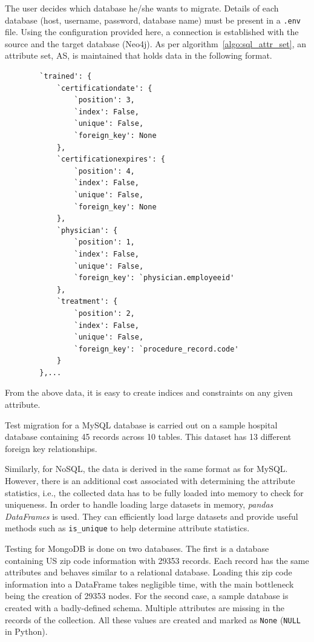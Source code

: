 \documentclass[12pt]{article}
\begin{document}
    The user decides which database he/she wants to migrate. Details of each database (host, username, password, database name) must be present in a \verb|.env| file. Using the configuration provided here, a connection is established with the source and the target database (Neo4j). As per algorithm~\ref{algo:sql_attr_set}, an attribute set, AS, is maintained that holds data in the following format.
    \begin{lstlisting}
        `trained': {
            `certificationdate': {
                `position': 3, 
                `index': False, 
                `unique': False, 
                `foreign_key': None
            },
            `certificationexpires': {
                `position': 4, 
                `index': False, 
                `unique': False, 
                `foreign_key': None
            },
            `physician': {
                `position': 1, 
                `index': False, 
                `unique': False, 
                `foreign_key': `physician.employeeid'
            },
            `treatment': {
                `position': 2, 
                `index': False, 
                `unique': False, 
                `foreign_key': `procedure_record.code'
            }
        },...
    \end{lstlisting}

    From the above data, it is easy to create indices and constraints on any given attribute.

    Test migration for a MySQL database is carried out on a sample hospital database containing 45 records across 10 tables. This dataset has 13 different foreign key relationships.

    Similarly, for NoSQL, the data is derived in the same format as for MySQL. However, there is an additional cost associated with determining the attribute statistics, i.e., the collected data has to be fully loaded into memory to check for uniqueness. In order to handle loading large datasets in memory, \textit{pandas DataFrames} is used. They can efficiently load large datasets and provide useful methods such as \verb|is_unique| to help determine attribute statistics.

    Testing for MongoDB is done on two databases. The first is a database containing US zip code information with 29353 records. Each record has the same attributes and behaves similar to a relational database. Loading this zip code information into a DataFrame takes negligible time, with the main bottleneck being the creation of 29353 nodes. For the second case, a sample database is created with a badly-defined schema. Multiple attributes are missing in the records of the collection. All these values are created and marked as \verb|None| (\verb|NULL| in Python).
\end{document}
